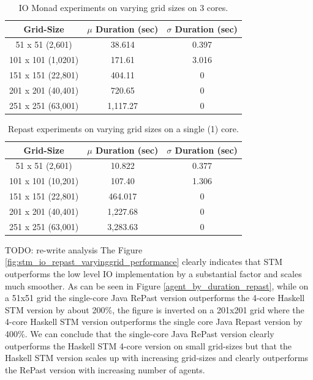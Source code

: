\begin{table}
	\centering
  	\begin{tabular}{ c || c | c }
        Grid-Size         & $\mu$ Duration (sec) & $\sigma$ Duration (sec) \\ \hline \hline 
   		51 x 51   (2,601)  & 38.614 			 & 0.397 \\ \hline
   		101 x 101 (1,0201) & 171.61 			 & 3.016 \\ \hline
   		151 x 151 (22,801) & 404.11				 & 0 \\ \hline
   		201 x 201 (40,401) & 720.65 			 & 0 \\ \hline 
   		251 x 251 (63,001) & 1,117.27 			 & 0 \\ \hline 
  	\end{tabular}
  	
  	\caption{IO Monad experiments on varying grid sizes on 3 cores.}
	\label{tab:varyinggrid_constcores3_IO}
\end{table}

\begin{table}
	\centering
  	\begin{tabular}{ c || c | c }
        Grid-Size          & $\mu$ Duration (sec) & $\sigma$ Duration (sec) \\ \hline \hline 
   		51 x 51 (2,601)    & 10.822 		     & 0.377 \\ \hline
   		101 x 101 (10,201) & 107.40 		     & 1.306 \\ \hline
   		151 x 151 (22,801) & 464.017      		 & 0 \\ \hline
   		201 x 201 (40,401) & 1,227.68 			 & 0 \\ \hline 
   		251 x 251 (63,001) & 3,283.63			 & 0 \\ \hline 
  	\end{tabular}
  	
  	\caption{Repast experiments on varying grid sizes on a single (1) core.}
	\label{tab:varyinggrid_constcores_repast}
\end{table}

TODO: re-write analysis
The Figure \ref{fig:stm_io_repast_varyinggrid_performance} clearly indicates that STM outperforms the low level IO implementation by a substantial factor and scales much smoother. As can be seen in Figure \ref{agent_by_duration_repast}, while on a 51x51 grid the single-core Java RePast version outperforms the 4-core Haskell STM version by about 200\%, the figure is inverted on a 201x201 grid where the 4-core Haskell STM version outperforms the single core Java Repast version by 400\%. We can conclude that the single-core Java RePast version clearly outperforms the Haskell STM 4-core version on small grid-sizes but that the Haskell STM version scales up with increasing grid-sizes and clearly outperforms the RePast version with increasing number of agents.

